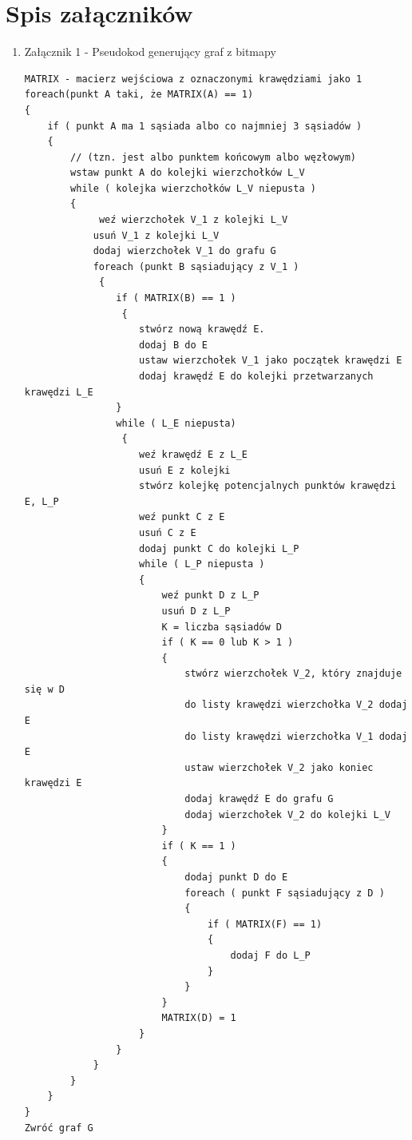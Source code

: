 \documentclass[a4paper,11pt,twoside,openright]{report}
\theoremstyle{definition}
\begin{document}
\chapter*{Spis załączników}
\begin{enumerate}
\item Załącznik 1 - Pseudokod generujący graf z bitmapy

\begin{verbatim}
MATRIX - macierz wejściowa z oznaczonymi krawędziami jako 1
foreach(punkt A taki, że MATRIX(A) == 1)
{
    if ( punkt A ma 1 sąsiada albo co najmniej 3 sąsiadów )
    {
        // (tzn. jest albo punktem końcowym albo węzłowym)
        wstaw punkt A do kolejki wierzchołków L_V
        while ( kolejka wierzchołków L_V niepusta )
        {
             weź wierzchołek V_1 z kolejki L_V
            usuń V_1 z kolejki L_V
            dodaj wierzchołek V_1 do grafu G
            foreach (punkt B sąsiadujący z V_1 )
             {
                if ( MATRIX(B) == 1 )
                 {
                    stwórz nową krawędź E.
                    dodaj B do E
                    ustaw wierzchołek V_1 jako początek krawędzi E
                    dodaj krawędź E do kolejki przetwarzanych krawędzi L_E
                }
                while ( L_E niepusta)
                 {
                    weź krawędź E z L_E
                    usuń E z kolejki
                    stwórz kolejkę potencjalnych punktów krawędzi E, L_P
                    weź punkt C z E
                    usuń C z E
                    dodaj punkt C do kolejki L_P
                    while ( L_P niepusta )
                    {
                        weź punkt D z L_P
                        usuń D z L_P
                        K = liczba sąsiadów D
                        if ( K == 0 lub K > 1 )
                        {
                            stwórz wierzchołek V_2, który znajduje się w D
                            do listy krawędzi wierzchołka V_2 dodaj E
                            do listy krawędzi wierzchołka V_1 dodaj E
                            ustaw wierzchołek V_2 jako koniec krawędzi E
                            dodaj krawędź E do grafu G
                            dodaj wierzchołek V_2 do kolejki L_V
                        }
                        if ( K == 1 )
                        {
                            dodaj punkt D do E
                            foreach ( punkt F sąsiadujący z D )
                            {
                                if ( MATRIX(F) == 1)
                                {
                                    dodaj F do L_P
                                }
                            }
                        }
                        MATRIX(D) = 1
                    }
                }
            }
        }
    }
}
Zwróć graf G
\end{verbatim}


\end{enumerate}
\end{document}
